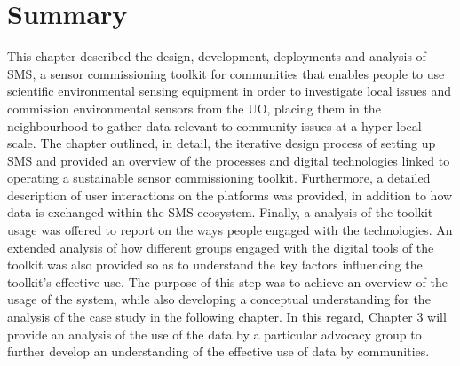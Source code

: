 \section{Summary}
This chapter described the design, development, deployments and analysis of SMS, a sensor commissioning toolkit for communities that enables people to use scientific environmental sensing equipment in order to investigate local issues and commission environmental sensors from the UO, placing them in the neighbourhood to gather data relevant to community issues at a hyper-local scale. The chapter outlined, in detail, the iterative design process of setting up SMS and provided an overview of the processes and digital technologies linked to operating a sustainable sensor commissioning toolkit. Furthermore, a detailed description of user interactions on the platforms was provided, in addition to how data is exchanged within the SMS ecosystem. Finally, a analysis of the toolkit usage was offered to report on the ways people engaged with the technologies. An extended analysis of how different groups engaged with the digital tools of the toolkit was also provided so as to understand the key factors influencing the toolkit's effective use. The purpose of this step was to achieve an overview of the usage of the system, while also developing a conceptual understanding for the analysis of the case study in the following chapter. In this regard, Chapter 3 will provide an analysis of the use of the data by a particular advocacy group to further develop an understanding of the effective use of data by communities.